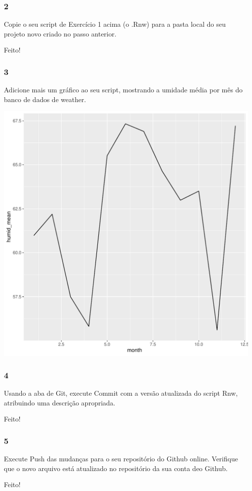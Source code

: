 \documentclass{beamer}\usepackage[]{graphicx}\usepackage[]{xcolor}
\makeatletter
\def\maxwidth{ %
  \ifdim\Gin@nat@width>\linewidth
    \linewidth
  \else
    \Gin@nat@width
  \fi
}
\newenvironment{knitrout}{}{} %
\makeatother
\begin{document}
\begin{frame}
\frametitle{2}
Copie o seu script de Exercício 1 acima (o .Rnw) para a pasta local do seu projeto novo criado no passo anterior.

Feito!
\end{frame}

\begin{frame}[fragile]
\frametitle{3}
Adicione mais um gráfico ao seu script, mostrando a umidade média por mês do banco de dados de weather.

\begin{knitrout}
\color{fgcolor}
\includegraphics[width=\maxwidth]{figure/unnamed-chunk-3-1} 
\end{knitrout}

\end{frame}

\begin{frame}
\frametitle{4}
Usando a aba de Git, execute Commit com a versão atualizada do script Rnw, atribuindo uma descrição apropriada.

Feito!
\end{frame}

\begin{frame}
\frametitle{5}
Execute Push das mudanças para o seu repositório do Github online. Verifique que o novo arquivo está atualizado no repositório da sua conta deo Github.

Feito!
\end{frame} 
\end{document}
